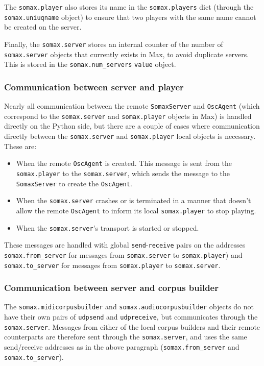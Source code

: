 The \texttt{somax.player} also stores its name in the \texttt{somax.players} dict (through the \texttt{somax.uniuqname} object)  to ensure that two players with the same name cannot be created on the server.

Finally, the \texttt{somax.server} stores an internal counter of the number of \texttt{somax.server} objects that currently exists in Max, to avoid duplicate servers. This is stored in the \texttt{somax.num\_servers} \texttt{value} object.

\subsubsection{Communication between server and player}
Nearly all communication between the remote \texttt{SomaxServer} and \texttt{OscAgent} (which correspond to the \texttt{somax.server} and \texttt{somax.player} objects in Max) is handled directly on the Python side, but there are a couple of cases where communication directly between the \texttt{somax.server} and \texttt{somax.player} local objects is necessary. These are:
\begin{itemize}
	\item When the remote \texttt{OscAgent} is created. This message is sent from the \texttt{somax.player} to the \texttt{somax.server}, which sends the message to the \texttt{SomaxServer} to create the \texttt{OscAgent}. 
	\item When the \texttt{somax.server} crashes or is terminated in a manner that doesn't allow the remote \texttt{OscAgent} to inform its local \texttt{somax.player} to stop playing.
	\item When the \texttt{somax.server}'s transport is started or stopped.
\end{itemize}

\noindent These messages are handled with global \texttt{send}-\texttt{receive} pairs on the addresses \texttt{somax.from\_server} for messages from \texttt{somax.server} to \texttt{somax.player}) and \texttt{somax.to\_server} for messages from \texttt{somax.player} to \texttt{somax.server}.


\subsubsection{Communication between server and corpus builder}

The \texttt{somax.midicorpusbuilder} and \texttt{somax.audiocorpusbuilder} objects do not have their own pairs of \texttt{udpsend} and \texttt{udpreceive}, but communicates through the \texttt{somax.server}. Messages from either of the local corpus builders and their remote counterparts are therefore sent through the \texttt{somax.server}, and uses the same send/receive addresses as in the above paragraph (\texttt{somax.from\_server} and \texttt{somax.to\_server}).


